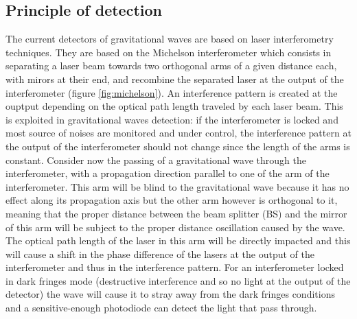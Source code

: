 
\subsection{Principle of detection}
\label{sec:detection_principle}

The current detectors of gravitational waves are based on laser interferometry techniques.
They are based on the Michelson interferometer which consists in separating a laser beam towards two orthogonal arms of a given distance each, with mirors at their end, and recombine the separated laser at the output of the interferometer (figure \ref{fig:michelson}).
An interference pattern is created at the ouptput depending on the optical path length traveled by each laser beam.
This is exploited in gravitational waves detection: if the interferometer is locked and most source of noises are monitored and under control, the interference pattern at the output of the interferometer should not change since the length of the arms is constant.
Consider now the passing of a gravitational wave through the interferometer, with a propagation direction parallel to one of the arm of the interferometer.
This arm will be blind to the gravitational wave because it has no effect along its propagation axis but the other arm however is orthogonal to it, meaning that the proper distance between the beam splitter (BS) and the mirror of this arm will be subject to the proper distance oscillation caused by the wave.
The optical path length of the laser in this arm will be directly impacted and this will cause a shift in the phase difference of the lasers at the output of the interferometer and thus in the interference pattern.
For an interferometer locked in dark fringes mode (destructive interference and so no light at the output of the detector) the wave will cause it to stray away from the dark fringes conditions and a sensitive-enough photodiode can detect the light that pass through.

